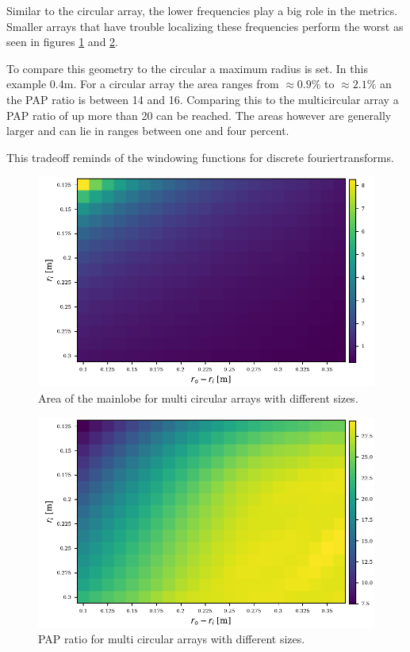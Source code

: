 Similar to the circular array, the lower frequencies play a big role in the metrics.
Smaller arrays that have trouble localizing these frequencies perform the worst as seen
in figures \ref*{aev:fig:FancyArea} and \ref*{aev:fig:FancyPap}.





To compare this geometry to the circular a maximum radius is set.
In this example 0.4m. 
For a circular array the area ranges from $\approx 0.9\%$ to 
$\approx 2.1\%$ an the PAP ratio is between 14 and 16.
Comparing this to the multicircular array a PAP ratio of up
more than 20 can be reached. 
The areas however are generally larger and can lie in ranges 
between one and four percent.

This tradeoff reminds of the windowing functions for discrete
fouriertransforms. 
\begin{figure}[h]
	\centering
	\includegraphics[]{images/5_array_evaluation/fancy_area.pdf}
	\caption{Area of the mainlobe for multi circular arrays with different
	sizes.}
	\label{aev:fig:FancyArea}
\end{figure}
\begin{figure}
	\centering
	\includegraphics[]{images/5_array_evaluation/fancy_pap.pdf}
	\caption{PAP ratio for multi circular arrays with different
	sizes.}
	\label{aev:fig:FancyPap}
\end{figure}


